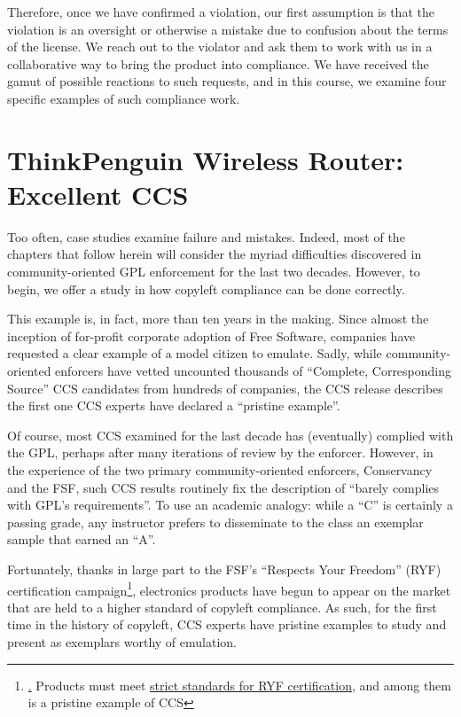 Therefore, once we have confirmed a violation, our first assumption is
that the violation is an oversight or otherwise a mistake due to confusion
about the terms of the license. We reach out to the violator and ask them
to work with us in a collaborative way to bring the product into
compliance. We have received the gamut of possible reactions to such
requests, and in this course, we examine four specific examples of such
compliance work.

\chapter{ThinkPenguin Wireless Router: Excellent CCS}

Too often, case studies examine failure and mistakes.  Indeed, most of the
chapters that follow herein will consider the myriad difficulties discovered
in community-oriented GPL enforcement for the last two decades.  However, to
begin, we offer a study in how copyleft compliance can be done correctly.

This example is, in fact, more than ten years in the making.  Since almost
the inception of for-profit corporate adoption of Free Software, companies
have requested a clear example of a model citizen to emulate.  Sadly, while
community-oriented enforcers have vetted uncounted thousands of ``Complete,
Corresponding Source'' CCS candidates from hundreds of companies, the CCS
release describes the first one CCS experts have declared a ``pristine
example''.


Of course, most CCS examined for the last decade has (eventually) complied
with the GPL, perhaps after many iterations of review by the enforcer.
However, in the experience of the two primary community-oriented enforcers,
Conservancy and the FSF, such CCS results routinely fix the description of
``barely complies with GPL's requirements''.  To use an academic analogy:
while a ``C'' is certainly a passing grade, any instructor prefers to
disseminate to the class an exemplar sample that earned an ``A''.

Fortunately, thanks in large part to the FSF's
``Respects Your Freedom'' (RYF) certification campaign\footnote{\href{RYF is
    a campaign by FSF to certify products that truly meet the principles of
    software freedom}.  Products must meet
  \href{http://www.fsf.org/resources/hw/endorsement/criteria}{strict
    standards for RYF certification}, and among them is a pristine example of
  CCS\@}, electronics products have begun to appear on the market that are
held to a higher standard of copyleft compliance.  As such, for the first
time in the history of copyleft, CCS experts have pristine examples to study
and present as exemplars worthy of emulation.

